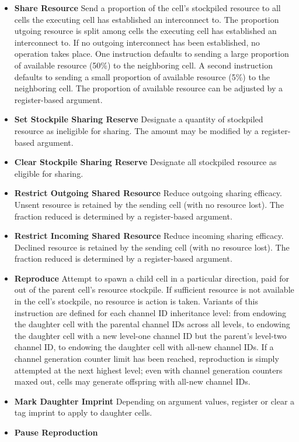 \begin{itemize}
\item \textbf{Share Resource}
Send a proportion of the cell's stockpiled resource to all cells the executing cell has established an interconnect to.
The proportion utgoing resource is split among cells the executing cell has established an interconnect to.
If no outgoing interconnect has been established, no operation takes place.
One instruction defaults to sending a large proportion of available resource (50\%) to the neighboring cell.
A second instruction defaults to sending a small proportion of available resource (5\%) to the neighboring cell.
The proportion of available resource can be adjusted by a register-based argument.
\item \textbf{Set Stockpile Sharing Reserve}
Designate a quantity of stockpiled resource as ineligible for sharing.
The amount may be modified by a register-based argument.
\item \textbf{Clear Stockpile Sharing Reserve}
Designate all stockpiled resource as eligible for sharing.
\item \textbf{Restrict Outgoing Shared Resource}
Reduce outgoing sharing efficacy.
Unsent resource is retained by the sending cell (with no resource lost).
The fraction reduced is determined by a register-based argument.
\item \textbf{Restrict Incoming Shared Resource}
Reduce incoming sharing efficacy.
Declined resource is retained by the sending cell (with no resource lost).
The fraction reduced is determined by a register-based argument.
\item \textbf{Reproduce}
Attempt to spawn a child cell in a particular direction, paid for out of the parent cell's resource stockpile.
If sufficient resource is not available in the cell's stockpile, no resource is action is taken.
Variants of this instruction are defined for each channel ID inheritance level: from endowing the daughter cell with the parental channel IDs across all levels, to endowing the daughter cell with a new level-one channel ID but the parent's level-two channel ID, to endowing the daughter cell with all-new channel IDs.
If a channel generation counter limit has been reached, reproduction is simply attempted at the next highest level; even with channel generation counters maxed out, cells may generate offspring with all-new channel IDs.
\item \textbf{Mark Daughter Imprint}
Depending on argument values, register or clear a tag imprint to apply to daughter cells.
\item \textbf{Pause Reproduction}

\end{itemize}
